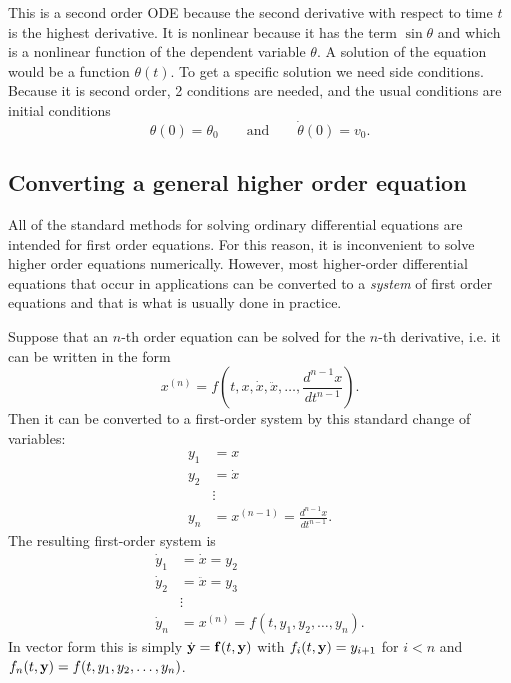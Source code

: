 This is a second order ODE because the second derivative with respect
to time $t$ is the highest derivative. It is nonlinear because it has
the term $\sin \theta$ and which is a nonlinear function of the
dependent variable $\theta$. A solution of the equation would be a
function $\theta(t)$. To get a specific solution we need side
conditions.  Because it is second order, 2 conditions are needed, and
the usual conditions are initial conditions
\begin{equation}\label{pendulumic}
\theta(0) = \theta_0 \qquad \text{and} \qquad \dot{\theta}(0) = v_0.
\end{equation}


\subsection*{Converting a general higher order equation}

All of the standard methods for solving ordinary differential equations
are intended for first order equations. For this reason, it is inconvenient
to solve higher order equations numerically.
However, most higher-order differential equations that
occur in applications can be converted to a {\em system} of
first order equations and that is what is usually done in practice.

Suppose that an $n$-th order equation can be solved for the
$n$-th derivative, i.e. it can be written in the form
\begin{equation*}
x^{(n)} = f\left(t,x,\dot{x},\ddot{x}, \ldots,
                   \frac{d^{n-1}x}{dt^{n-1}}\right).
\end{equation*}
Then it can be converted to a first-order system by this
standard change of variables:
\begin{equation*}
\begin{split}
y_1 &= x\\
y_2 &= \dot{x}\\
   & \vdots \\
y_n & = x^{(n-1)} = \frac{d^{n-1}x}{dt^{n-1}}.
\end{split}
\end{equation*}
The resulting first-order system is
\begin{equation*}
\begin{split}
\dot{y}_1 &= \dot{x} = y_2\\
\dot{y}_2 &= \ddot{x} = y_3\\
   & \vdots \\
\dot{y}_n &= x^{(n)} = f(t,y_1,y_2,\ldots,y_n).
\end{split}
\end{equation*}
In vector form this is simply $\dot{\mathbf{y}}=\mathbf{f}(t,\mathbf{y})$ with
$f_i(t,\mathbf{y})=y_{i+1}$ for $i<n$ and
$f_n(t,\mathbf{y})=f(t,y_1,y_2,\ldots,y_n)$.



